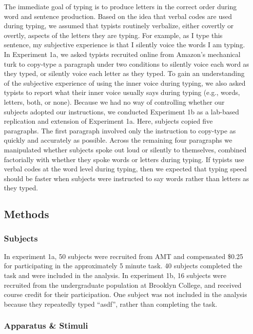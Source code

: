 \documentclass[floatsintext,man]{apa6}
\theoremstyle{definition}
\theoremstyle{definition}
\theoremstyle{definition}
\theoremstyle{remark}
\begin{document}
The immediate goal of typing is to produce letters in the correct order
during word and sentence production. Based on the idea that verbal codes
are used during typing, we assumed that typists routinely verbalize,
either covertly or overtly, aspects of the letters they are typing. For
example, as I type this sentence, my subjective experience is that I
silently voice the words I am typing. In Experiment 1a, we asked typists
recruited online from Amazon's mechanical turk to copy-type a paragraph
under two conditions to silently voice each word as they typed, or
silently voice each letter as they typed. To gain an understanding of
the subjective experience of using the inner voice during typing, we
also asked typists to report what their inner voice usually says during
typing (e.g., words, letters, both, or none). Because we had no way of
controlling whether our subjects adopted our instructions, we conducted
Experiment 1b as a lab-based replication and extension of Experiment 1a.
Here, subjects copied five paragraphs. The first paragraph involved only
the instruction to copy-type as quickly and accurately as possible.
Across the remaining four paragraphs we manipulated whether subjects
spoke out loud or silently to themselves, combined factorially with
whether they spoke words or letters during typing. If typists use verbal
codes at the word level during typing, then we expected that typing
speed should be faster when subjects were instructed to say words rather
than letters as they typed.

\subsection{Methods}\label{methods}

\subsubsection{Subjects}\label{subjects}

In experiment 1a, 50 subjects were recruited from AMT and compensated
\$0.25 for participating in the approximately 5 minute task. 40 subjects
completed the task and were included in the analysis. In experiment 1b,
16 subjects were recruited from the undergraduate population at Brooklyn
College, and received course credit for their participation. One subject
was not included in the analysis because they repeatedly typed
\enquote{asdf}, rather than completing the task.

\subsubsection{Apparatus \& Stimuli}\label{apparatus-stimuli}
\end{document}
